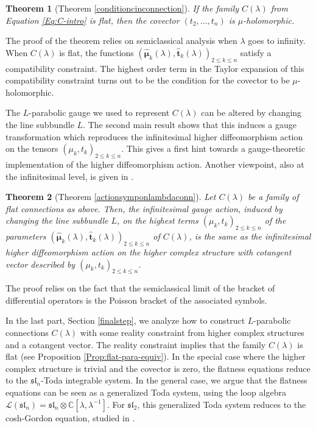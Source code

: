 \documentclass[11pt]{amsart}
\newtheorem{fakethm}{Theorem}
\numberwithin{thm}{section} %
\numberwithin{equation}{section} %
\numberwithin{figure}{section} %
\newcommand*{\C}{\mathbb{C}}
\renewcommand*{\l}{\lambda}
\begin{document}
\begin{fakethm}[Theorem \ref{conditioncinconnection}]
If the family $C(\l)$ from Equation \eqref{Eq:C-intro} is flat, then the covector $(t_2,...,t_n)$ is $\mu$-holomorphic.
\end{fakethm} 

The proof of the theorem relies on semiclassical analysis when $\l$ goes to infinity. When $C(\l)$ is flat, the functions $(\bm\hat{\mu}_k(\l),\bm\hat{t}_k(\l))_{2\leq k\leq n}$ satisfy a compatibility constraint. The highest order term in the Taylor expansion of this compatibility constraint turns out to be the condition for the covector to be $\mu$-holomorphic.

The $L$-parabolic gauge we used to represent $C(\l)$ can be altered by changing the line subbundle $L$. The second main result shows that this induces a gauge transformation which reproduces the infinitesimal higher diffeomorphism action on the tensors $(\mu_k,t_k)_{2\leq k\leq n}$. This gives a first hint towards a gauge-theoretic implementation of the higher diffeomorphism action. Another viewpoint, also at the infinitesimal level, is given in \cite[Thm F]{Fock-bundles}.

\begin{fakethm}[Theorem \ref{actionsymponlambdaconn}]
Let $C(\l)$ be a family of flat connections as above. Then, the infinitesimal gauge action, induced by changing the line subbundle $L$, on the highest terms $(\mu_k,t_k)_{2\leq k\leq n}$ of the parameters $(\bm\hat{\mu}_k(\l),\bm\hat{t}_k(\l))_{2\leq k\leq n}$ of $C(\l)$, is the same as the infinitesimal higher diffeomorphism action on the higher complex structure with cotangent vector described by $(\mu_k,t_k)_{2\leq k\leq n}$.
\end{fakethm}

The proof relies on the fact that the semiclassical limit of the bracket of differential operators is the Poisson bracket of the associated symbols.

In the last part, Section \ref{finalstep}, we analyze how to construct $L$-parabolic connections $C(\l)$ with some reality constraint from higher complex structures and a cotangent vector. The reality constraint implies that the family $C(\l)$ is flat (see Proposition \ref{Prop:flat-para-equiv}).
In the special case where the higher complex structure is trivial and the covector is zero, the flatness equations reduce to the $\mathfrak{sl}_n$-Toda integrable system. In the general case, we argue that the flatness equations can be seen as a generalized Toda system, using the loop algebra $\mathcal{L}(\mathfrak{sl}_n)=\mathfrak{sl}_n\otimes \C[\l,\l^{-1}]$. For $\mathfrak{sl}_2$, this generalized Toda system reduces to the cosh-Gordon equation, studied in \cite{Fock}.
\end{document}
